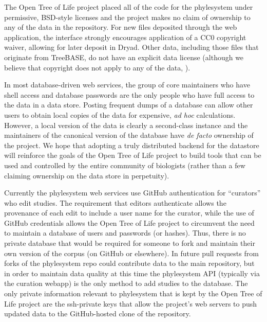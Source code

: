 \documentclass{bioinfo}
\newcommand{\ps}{phylesystem\xspace}
\newcommand{\otol}{Open Tree of Life\xspace}
\begin{document}
The \otol project placed all of the code for the \ps under permissive, BSD-style licenses and the
    project makes no claim of ownership to any of the data in the repository. 
For new files deposited through the web application, the interface strongly encourages application of a CC0 copyright waiver, 
    allowing for later deposit in Dryad. Other data, including those files that originate from TreeBASE,
    do not have an explicit data license (although we believe that copyright does not apply to any of the data, \citet{Patterson2014}).

In most database-driven web services, the group of core maintainers who have shell access and 
    database passwords are the only people who have full access to the data in a data store.
Posting frequent dumps of a database can allow other users to obtain local copies of the data 
    for expensive, {\em ad hoc} calculations.
However, a local version of the data is clearly a second-class instance and the maintainers of the 
    canonical version of the database have {\em de facto} ownership of the project.
We hope that adopting a truly distributed backend for the datastore will reinforce the goals
    of the \otol project to build tools that can be used and controlled by the entire community of biologists 
    (rather than a few claiming ownership on the data store in perpetuity).

Currently the \ps web services use GitHub authentication for ``curators'' who edit studies.
The requirement that editors authenticate allows the provenance of each edit to include 
    a user name for the curator, while the use of GitHub credentials allows the \otol project
    to circumvent the need to maintain a database of users and passwords (or hashes).
Thus, there is no private database that would be required for someone to fork and maintain their
    own version of the corpus (on GitHub or elsewhere).
In future pull requests from forks of the \ps repo could contribute data to the main repository,
   but in order to maintain data quality at this time the phylesystem API (typically via the curation webapp) is the only method to add studies to the database.
The only private information relevant to \ps that is kept by the \otol project are the ssh-private
    keys that allow the project's web servers to push updated data to the GitHub-hosted clone of the 
    repository.
\end{document}
